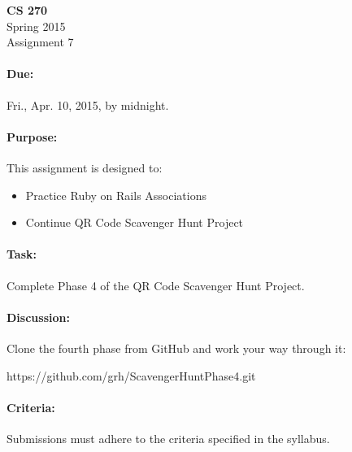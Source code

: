 \documentclass[11pt]{article}
\begin{document}
    \begin{center}

        \large\textbf{CS 270} \\
        Spring 2015 \\
        Assignment 7 \\

    \end{center}

    \paragraph{Due:} Fri., Apr. 10, 2015, by midnight.

    \paragraph{Purpose:} This assignment is designed to:

        \begin{itemize}

            \item Practice Ruby on Rails Associations

            \item Continue QR Code Scavenger Hunt Project

        \end{itemize}

    \paragraph{Task:} Complete Phase 4 of the QR Code Scavenger Hunt
    Project.
    
    \paragraph{Discussion:} Clone the fourth phase from
    GitHub and work your way through it:

    \begin{center}

        https://github.com/grh/ScavengerHuntPhase4.git

    \end{center}

    \paragraph{Criteria:} Submissions must adhere to the criteria
    specified in the syllabus.
\end{document}
